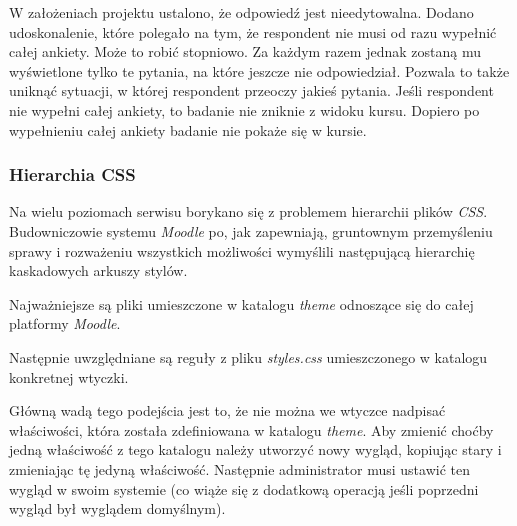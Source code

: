 \documentclass[12pt]{report}
\begin{document}
W założeniach projektu ustalono, że odpowiedź jest nieedytowalna. Dodano udoskonalenie, które polegało na tym, że respondent nie musi od razu wypełnić całej ankiety. Może to robić stopniowo. Za każdym razem jednak zostaną mu wyświetlone tylko te pytania, na które jeszcze nie odpowiedział. Pozwala to także uniknąć sytuacji, w której respondent przeoczy jakieś pytania. Jeśli respondent nie wypełni całej ankiety, to badanie nie zniknie z widoku kursu. Dopiero po wypełnieniu całej ankiety badanie nie pokaże się w kursie.

\subsubsection{Hierarchia CSS}
Na wielu poziomach serwisu borykano się z problemem hierarchii plików \emph{CSS}. Budowniczowie systemu \emph{Moodle} po, jak zapewniają, gruntownym przemyśleniu sprawy i rozważeniu wszystkich możliwości wymyślili następującą hierarchię kaskadowych arkuszy stylów.
\begin{description}
\item Najważniejsze są pliki umieszczone w katalogu \emph{theme} odnoszące się do całej platformy \emph{Moodle}.
\item Następnie uwzględniane są reguły z pliku \emph{styles.css} umieszczonego w katalogu konkretnej wtyczki.
\end{description}
Główną wadą tego podejścia jest to, że nie można we wtyczce nadpisać właściwości, która została zdefiniowana w katalogu \emph{theme}. Aby zmienić choćby jedną właściwość z tego katalogu należy utworzyć nowy wygląd, kopiując stary i zmieniając tę jedyną właściwość. Następnie administrator musi ustawić ten wygląd w swoim systemie (co wiąże się z dodatkową operacją jeśli poprzedni wygląd był wyglądem domyślnym).
\end{document}
